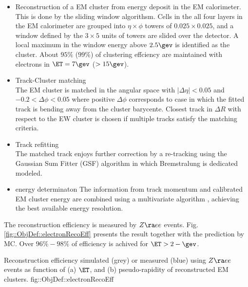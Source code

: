 \begin{itemize}
\item Reconstruction of a EM cluster from energy deposit in the EM calorimeter.
This is done by the sliding window algorithsm. Cells in the all four layers in the EM calorimeter are grouped into $\eta\times\phi$ towers of $0.025\times0.025$, and a window defined by the $3\times5$ units of towers are slided over the detector. A local maximum in the window energy above $2.5\gev$ is identified as the cluster. About $95\%$ ($99\%$) of clustering effciency are maintained with electrons in $\ET=7 \gev$ ($>15 \gev$).

\item Track-Cluster matching \\
The EM cluster is matched in the angular space with $|\Delta \eta|<0.05$ and $-0.2<\Delta \phi<0.05$ 
where positive $\Delta \phi$ corresponds to case in which the fitted track is bending away from the cluster barycente.
Closest track in $\Delta R$ with respect to the EW cluster is chosen if multiple tracks satisfy the matching criteria.

\item Track refitting \\
The matched track enjoys further correction by a re-tracking using the Gaussian Sum Fitter (GSF) \cite{158_GSF} algorithm in which Bremstralung is dedicated modeled.

\item energy determinaton
The information from track momentum and calibrated EM cluster energy are combined using a multivariate algorithm \cite{160_ElecCombMVA}, 
achieving the best available energy resolution.
\end{itemize}

The reconstruction efficiency is measured by $Z\ra ee$ events. Fig. \ref{fig::ObjDef::electronRecoEff} presents the result together with the prediction by MC. Over $96\%-98\%$ of efficiency is achived for $\ET>2-\gev$.

{ Reconstruction efficiency simulated (grey) or measured (blue) using $Z\ra ee$ events \cite{156_ElectronEffMeas_2015data} as function of (a) $\ET$, and (b) pseudo-rapidity of reconstructed EM clusters.}
{fig::ObjDef::electronRecoEff}


